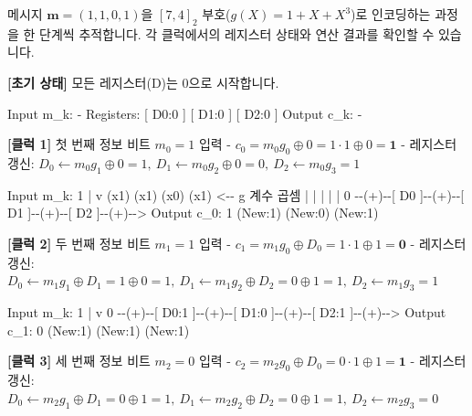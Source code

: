 \documentclass[
  oneside]{article}
\newenvironment{Shaded}{}{}
\newcommand{\NormalTok}[1]{#1}
\begin{document}
메시지 \(\mathbf{m} = (1, 1, 0, 1)\)을 \([7, 4]_2\)
부호(\(g(X)=1+X+X^3\))로 인코딩하는 과정을 한 단계씩 추적합니다. 각
클럭에서의 레지스터 상태와 연산 결과를 확인할 수 있습니다.

\textbf{{[}초기 상태{]}} 모든 레지스터(D)는 0으로 시작합니다.

\begin{Shaded}
\begin{Highlighting}[]
\NormalTok{  Input m\_k: {-}}
\NormalTok{  Registers: [ D0:0 ] [ D1:0 ] [ D2:0 ]}
\NormalTok{  Output c\_k: {-}}
\end{Highlighting}
\end{Shaded}

\textbf{{[}클럭 1{]}} 첫 번째 정보 비트 \textbf{\(m_0 = 1\)} 입력 -
\(c_0 = m_0 g_0 \oplus 0 = 1 \cdot 1 \oplus 0 = \mathbf{1}\) - 레지스터
갱신:
\(D_0 \leftarrow m_0 g_1 \oplus 0 = 1, \ D_1 \leftarrow m_0 g_2 \oplus 0 = 0, \ D_2 \leftarrow m_0 g_3 = 1\)

\begin{Shaded}
\begin{Highlighting}[]
\NormalTok{  Input m\_k: 1}
\NormalTok{       |}
\NormalTok{       v (x1)   (x1)   (x0)   (x1)   \textless{}{-}{-} g 계수 곱셈}
\NormalTok{       |   |      |      |      |}
\NormalTok{  0 {-}{-}(+){-}{-}[ D0 ]{-}{-}(+){-}{-}[ D1 ]{-}{-}(+){-}{-}[ D2 ]{-}{-}(+){-}{-}\textgreater{} Output c\_0: 1}
\NormalTok{           (New:1)      (New:0)      (New:1)}
\end{Highlighting}
\end{Shaded}

\textbf{{[}클럭 2{]}} 두 번째 정보 비트 \textbf{\(m_1 = 1\)} 입력 -
\(c_1 = m_1 g_0 \oplus D_0 = 1 \cdot 1 \oplus 1 = \mathbf{0}\) -
레지스터 갱신:
\(D_0 \leftarrow m_1 g_1 \oplus D_1 = 1 \oplus 0 = 1, \ D_1 \leftarrow m_1 g_2 \oplus D_2 = 0 \oplus 1 = 1, \ D_2 \leftarrow m_1 g_3 = 1\)

\begin{Shaded}
\begin{Highlighting}[]
\NormalTok{  Input m\_k: 1}
\NormalTok{       |}
\NormalTok{       v}
\NormalTok{  0 {-}{-}(+){-}{-}[ D0:1 ]{-}{-}(+){-}{-}[ D1:0 ]{-}{-}(+){-}{-}[ D2:1 ]{-}{-}(+){-}{-}\textgreater{} Output c\_1: 0}
\NormalTok{           (New:1)        (New:1)        (New:1)}
\end{Highlighting}
\end{Shaded}

\textbf{{[}클럭 3{]}} 세 번째 정보 비트 \textbf{\(m_2 = 0\)} 입력 -
\(c_2 = m_2 g_0 \oplus D_0 = 0 \cdot 1 \oplus 1 = \mathbf{1}\) -
레지스터 갱신:
\(D_0 \leftarrow m_2 g_1 \oplus D_1 = 0 \oplus 1 = 1, \ D_1 \leftarrow m_2 g_2 \oplus D_2 = 0 \oplus 1 = 1, \ D_2 \leftarrow m_2 g_3 = 0\)
\end{document}
